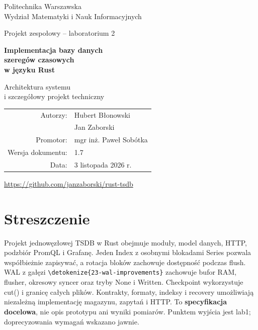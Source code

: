 \documentclass[11pt,a4paper]{article}
\newcommand{\code}[1]{\expandafter\nolinkurl\expandafter{\detokenize{#1}}}
\begin{document}
\raggedbottom
\hypersetup{pageanchor=false}
\begin{titlepage}
\centering
{\large Politechnika Warszawska\\
Wydział Matematyki i Nauk Informacyjnych\par}
\vspace{2.1cm}
{\Large Projekt zespołowy -- laboratorium 2\par}
\vspace{1.2cm}
{\huge\bfseries Implementacja bazy danych\\
szeregów czasowych\\w języku Rust\par}
\vspace{1.1cm}
{\LARGE Architektura systemu\\i szczegółowy projekt techniczny\par}
\vspace{1.4cm}
\begin{tabular}{rl}
Autorzy: & Hubert Błonowski\\
         & Jan Zaborski\\[0.5em]
Promotor: & mgr inż. Paweł Sobótka\\[0.5em]
Wersja dokumentu: & 1.7\\
Data: & 3 listopada 2026 r.
\end{tabular}
\vfill
\url{https://github.com/janzaborski/rust-tsdb}
\vspace{0.8cm}
\end{titlepage}
\hypersetup{pageanchor=true}

\section*{Streszczenie}
Projekt jednowęzłowej TSDB w Rust obejmuje moduły, model danych,
HTTP, podzbiór PromQL i Grafanę. Jeden Index z osobnymi blokadami Series
pozwala współbieżnie zapisywać, a rotacja bloków zachowuje dostępność
podczas flush. WAL z gałęzi \code{23-wal-improvements} zachowuje bufor RAM,
flusher, okresowy syncer oraz tryby None i Written. Checkpoint
wykorzystuje cut() i granicę całych plików. Kontrakty, formaty, indeksy i recovery umożliwiają
niezależną implementację magazynu, zapytań i HTTP.
To \textbf{specyfikacja docelowa}, nie opis prototypu ani wyniki pomiarów.
Punktem wyjścia jest lab1; doprecyzowania wymagań wskazano jawnie.
\end{document}
